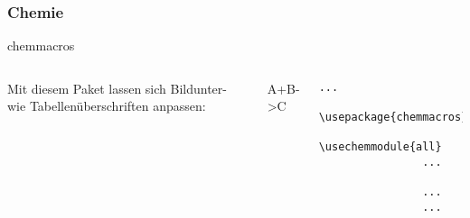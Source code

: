 \subsubsection{Chemie}
\begin{frame}[fragile]{chemmacros}
	\begin{columns}[c]
		    Mit diesem Paket lassen sich Bildunter- wie Tabellenüberschriften anpassen:
			\vspace{\baselineskip}\linebreak
		    \begin{outputbox}
				\begin{centering}
					  
					\begin{reaction}
						A+B->C
					\end{reaction}
				\end{centering}
			\end{outputbox}
			\begin{lstlisting}[gobble=16]
				...
				\usepackage{chemmacros}
				\usechemmodule{all} 
				...
				
				...
				...
				
			\end{lstlisting}
	\end{columns}
\end{frame}